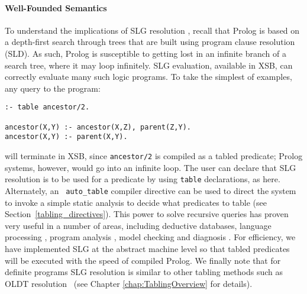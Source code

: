 \paragraph{Well-Founded Semantics} To understand the implications of
SLG resolution \cite{ChWa96}, recall that Prolog is based on a
depth-first search through trees that are built using program clause
resolution (SLD).  As such, Prolog is susceptible to getting lost in
an infinite branch of a search tree, where it may loop infinitely.
SLG evaluation, available in XSB, can correctly evaluate many such
logic programs.  To take the simplest of examples, any query to the
program:
\begin{center}
\begin{minipage}{3.8in}
\begin{verbatim}
:- table ancestor/2.

ancestor(X,Y) :- ancestor(X,Z), parent(Z,Y).
ancestor(X,Y) :- parent(X,Y).
\end{verbatim}
\end{minipage}
\end{center}
will terminate in XSB, since {\tt ancestor/2} is compiled as a tabled
predicate; Prolog systems, however, would go into an infinite loop.
The user can declare that SLG resolution is to be used for a predicate
by using {\tt table} declarations, as here.  Alternately, an {\tt
auto\_table} compiler directive can be used to direct the system to
invoke a simple static analysis to decide what predicates to table
(see Section~\ref{tabling_directives}).  This power to solve recursive
queries has proven very useful in a number of areas, including
deductive databases, language processing \cite{syntactica, semantica},
program analysis \cite{DRW96, CoDS96, Boul97}, model checking
\cite{RRRSSW97} and diagnosis \cite{GSTPD00}.  For efficiency, we
have implemented SLG at the abstract machine level so that tabled
predicates will be executed with the speed of compiled Prolog.  We
finally note that for definite programs SLG resolution is similar to
other tabling methods such as OLDT resolution~\cite{TaSa86} (see
Chapter
\ref{chap:TablingOverview} for details).

